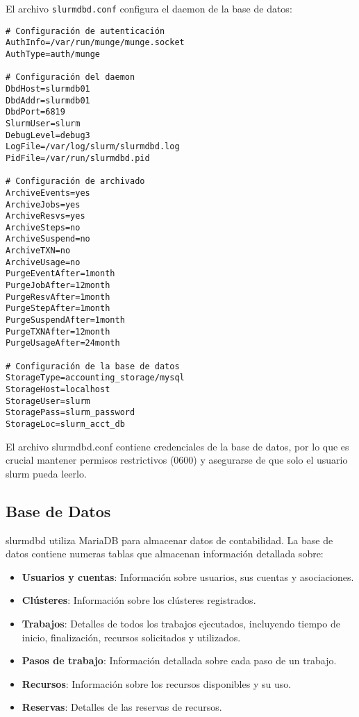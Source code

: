 \documentclass[12pt,a4paper]{article}
\begin{document}
El archivo \texttt{slurmdbd.conf} configura el daemon de la base de datos:

\begin{lstlisting}[language=slurm, caption=Configuración de slurmdbd]
# Configuración de autenticación
AuthInfo=/var/run/munge/munge.socket
AuthType=auth/munge

# Configuración del daemon
DbdHost=slurmdb01
DbdAddr=slurmdb01
DbdPort=6819
SlurmUser=slurm
DebugLevel=debug3
LogFile=/var/log/slurm/slurmdbd.log
PidFile=/var/run/slurmdbd.pid

# Configuración de archivado
ArchiveEvents=yes
ArchiveJobs=yes
ArchiveResvs=yes
ArchiveSteps=no
ArchiveSuspend=no
ArchiveTXN=no
ArchiveUsage=no
PurgeEventAfter=1month
PurgeJobAfter=12month
PurgeResvAfter=1month
PurgeStepAfter=1month
PurgeSuspendAfter=1month
PurgeTXNAfter=12month
PurgeUsageAfter=24month

# Configuración de la base de datos
StorageType=accounting_storage/mysql
StorageHost=localhost
StorageUser=slurm
StoragePass=slurm_password
StorageLoc=slurm_acct_db
\end{lstlisting}

\begin{infobox}
El archivo slurmdbd.conf contiene credenciales de la base de datos, por lo que es crucial mantener permisos restrictivos (0600) y asegurarse de que solo el usuario slurm pueda leerlo.
\end{infobox}

\subsection{Base de Datos}

slurmdbd utiliza MariaDB para almacenar datos de contabilidad. La base de datos contiene numeras tablas que almacenan información detallada sobre:

\begin{itemize}[leftmargin=*]
    \item \textbf{Usuarios y cuentas}: Información sobre usuarios, sus cuentas y asociaciones.
    \item \textbf{Clústeres}: Información sobre los clústeres registrados.
    \item \textbf{Trabajos}: Detalles de todos los trabajos ejecutados, incluyendo tiempo de inicio, finalización, recursos solicitados y utilizados.
    \item \textbf{Pasos de trabajo}: Información detallada sobre cada paso de un trabajo.
    \item \textbf{Recursos}: Información sobre los recursos disponibles y su uso.
    \item \textbf{Reservas}: Detalles de las reservas de recursos.
\end{itemize}
\end{document}
